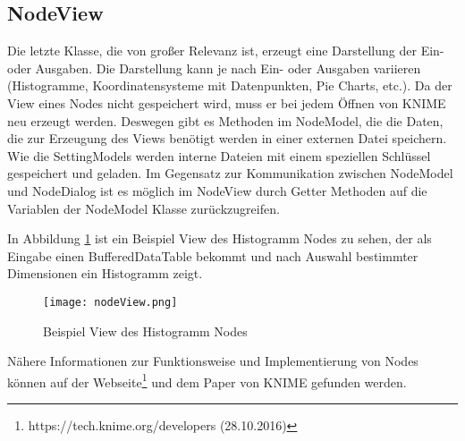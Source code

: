 \subsection{NodeView}
\label{ch:Analyse:sec:knime:subsec:nodeView}
Die letzte Klasse, die von großer Relevanz ist, erzeugt eine Darstellung der Ein- oder Ausgaben. Die Darstellung kann je nach Ein- oder Ausgaben variieren (Histogramme, Koordinatensysteme mit Datenpunkten, Pie Charts, etc.).
Da der View eines Nodes nicht gespeichert wird, muss er bei jedem Öffnen von KNIME neu erzeugt werden.
Deswegen gibt es Methoden im NodeModel, die die Daten, die zur Erzeugung des Views benötigt werden in einer externen Datei speichern. Wie die SettingModels werden interne Dateien mit einem speziellen Schlüssel gespeichert und geladen. Im Gegensatz zur Kommunikation zwischen NodeModel und NodeDialog ist es möglich im NodeView durch Getter Methoden auf die Variablen der NodeModel Klasse zurückzugreifen. 

In Abbildung \ref{img:nodeView} ist ein Beispiel View des Histogramm Nodes zu sehen, der als Eingabe einen BufferedDataTable bekommt und nach Auswahl bestimmter Dimensionen ein Histogramm zeigt. 

\begin{figure}[H]
	\centering
	\texttt{[image: nodeView.png]}
	\caption{Beispiel View des Histogramm Nodes}
	\label{img:nodeView}
\end{figure}

Nähere Informationen zur Funktionsweise und Implementierung von Nodes können auf der Webseite\footnote{https://tech.knime.org/developers (28.10.2016)} und dem Paper \cite{BCDG+07} von KNIME gefunden werden.
